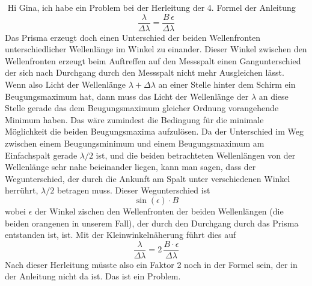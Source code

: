 \documentclass[a4paper, 12pt]{minimal}
\begin{document}
${ }$\newline
Hi Gina,\newline\newline
ich habe ein Problem bei der Herleitung der 4. Formel der Anleitung
\begin{equation*}\frac{\lambda}{\Delta\lambda}=\frac{B\,\epsilon}{\Delta\lambda}\end{equation*}
Das Prisma erzeugt doch einen Unterschied der beiden Wellenfronten unterschiedlicher Wellenlänge im Winkel zu einander. Dieser Winkel zwischen den Wellenfronten erzeugt beim Auftreffen auf den Messspalt einen Gangunterschied der sich nach Durchgang durch den Messspalt nicht mehr Ausgleichen lässt. Wenn also Licht der Wellenlänge $\lambda+\Delta\lambda$ an einer Stelle hinter dem Schirm ein Beugungsmaximum hat, dann muss das Licht der Wellenlänge der $\lambda$ an diese Stelle gerade das dem Beugungsmaximum gleicher Ordnung vorangehende Minimum haben. Das wäre zumindest die Bedingung für die minimale Möglichkeit die beiden Beugungsmaxima aufzulösen. Da der Unterschied im Weg zwischen einem Beugungsminimum und einem Beugungsmaximum am Einfachspalt gerade $\lambda/2$ ist, und die beiden betrachteten Wellenlängen von der Wellenlänge sehr nahe beieinander liegen, kann man sagen, dass der Wegunterschied, der durch die Ankunft am Spalt unter verschiedenen Winkel herrührt, $\lambda/2$ betragen muss. Dieser Wegunterschied ist 
\begin{equation*}\sin(\epsilon)\cdot{B}\end{equation*}
wobei $\epsilon$ der Winkel zischen den Wellenfronten der beiden Wellenlängen (die beiden orangenen in unserem Fall), der durch den Durchgang durch das Prisma entstanden ist, ist. Mit der Kleinwinkelnäherung führt dies auf
\begin{equation*}\frac{\lambda}{\Delta\lambda}=2\,\frac{B\cdot\epsilon}{\Delta\lambda}\end{equation*}
Nach dieser Herleitung müsste also ein Faktor 2 noch in der Formel sein, der in der Anleitung nicht da ist. Das ist ein Problem.
\end{document}
